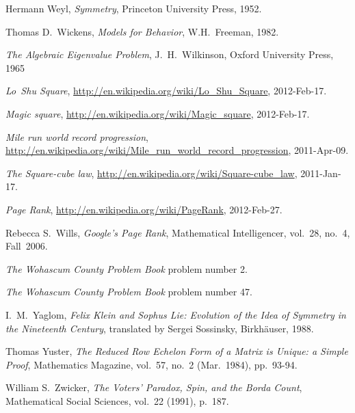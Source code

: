 \begin{thebibliography}{\makebox[2em][c]{{}\hfil{}}}
  Hermann Weyl,
  \emph{Symmetry},
  Princeton University Press,
  1952.

  Thomas D.~Wickens,
  \emph{Models for Behavior},
  W.H.~Freeman,
  1982.

  \emph{The Algebraic Eigenvalue Problem},
  J.~H.~Wilkinson,
  Oxford University Press,
  1965

  \emph{Lo~Shu Square},
  \url{http://en.wikipedia.org/wiki/Lo_Shu_Square},
  2012-Feb-17.

  \emph{Magic square},
  \url{http://en.wikipedia.org/wiki/Magic_square},
  2012-Feb-17.

  \emph{Mile run world record progression},
  \url{http://en.wikipedia.org/wiki/Mile_run_world_record_progression},
  2011-Apr-09.

  \emph{The Square-cube law},
  \url{http://en.wikipedia.org/wiki/Square-cube_law},
  2011-Jan-17.

  \emph{Page Rank},
  \url{http://en.wikipedia.org/wiki/PageRank},
  2012-Feb-27.

  Rebecca S.~Wills,
  \emph{Google's Page Rank},
  Mathematical Intelligencer,
  vol.~28, no.~4, Fall~2006.

  \emph{The Wohascum County Problem Book}
  problem number 2.

  \emph{The Wohascum County Problem Book}
  problem number 47.

  I.\ M.~Yaglom,
  \emph{Felix Klein and Sophus Lie: Evolution of the Idea of
   Symmetry in the Nineteenth Century},
  translated by Sergei Sossinsky,
  Birkh\"auser,
  1988.

  Thomas Yuster,
  \emph{The Reduced Row Echelon Form of a Matrix is Unique: a Simple Proof},
  Mathematics Magazine,
  vol.~57, no.~2 (Mar.~1984),
  pp.~93-94.

  William S.~Zwicker,
  \emph{The Voters' Paradox, Spin, and the Borda Count},
  Mathematical Social Sciences,
  vol.~22 (1991),
  p.~187. 

\end{thebibliography}
